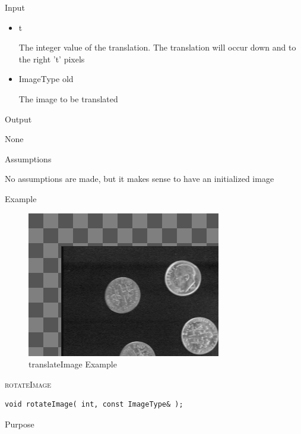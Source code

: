 \documentclass[pdftex, 11pt]{article}
\begin{document}
\begin{description}
\begin{description}
			\item{Input}

				\begin{itemize}

					\item{t}

						The integer value of the translation. The
						translation will occur down and 
						to the right 't' pixels

					\item{ImageType old}

						The image to be translated

				\end{itemize}

			\item{Output}

				None

			\item{Assumptions}

				No assumptions are made, but it makes sense to have
				an initialized image

			\item{Example}

				\begin{figure}[ht!]
					\centering
					\caption{translateImage Example}
				\includegraphics{images/outtrans.png}
			\end{figure}

		\end{description}


	\item{\textsc{rotateImage}}
		\begin{description}

\begin{lstlisting}
void rotateImage( int, const ImageType& );
\end{lstlisting}

			\item{Purpose}


\end{description}
\end{description}
\end{document}
